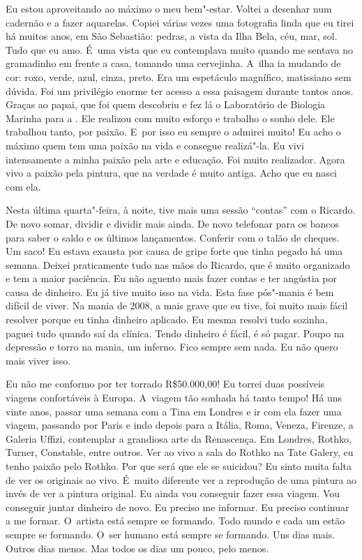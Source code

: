 Eu estou aproveitando ao máximo o meu bem"-estar. Voltei a desenhar num
cadernão e a fazer aquarelas. Copiei várias vezes uma fotografia linda
que eu tirei há muitos anos, em São Sebastião: pedras, a vista da Ilha
Bela, céu, mar, sol. Tudo que eu amo. É~uma vista que eu contemplava
muito quando me sentava no gramadinho em frente a casa, tomando uma
cervejinha. A~ilha ia mudando de cor: roxo, verde, azul, cinza, preto.
Era um espetáculo magnífico, matissiano sem dúvida. Foi um privilégio
enorme ter acesso a essa paisagem durante tantos anos. Graças ao papai,
que foi quem descobriu e fez lá o Laboratório de Biologia Marinha para a
. Ele realizou com muito esforço e trabalho o sonho dele. Ele
trabalhou tanto, por paixão. E~por isso eu sempre o admirei muito! Eu
acho o máximo quem tem uma paixão na vida e consegue realizá"-la. Eu vivi
intensamente a minha paixão pela arte e educação. Foi muito realizador.
Agora vivo a paixão pela pintura, que na verdade é muito antiga. Acho
que eu nasci com ela.

Nesta última quarta"-feira, à noite, tive mais uma sessão ``contas'' com
o Ricardo. De novo somar, dividir e dividir mais ainda. De novo
telefonar para os bancos para saber o saldo e os últimos lançamentos.
Conferir com o talão de cheques. Um saco! Eu estava exausta por causa de
gripe forte que tinha pegado há uma semana. Deixei praticamente tudo nas
mãos do Ricardo, que é muito organizado e tem a maior paciência. Eu não
aguento mais fazer contas e ter angústia por causa de dinheiro. Eu já
tive muito isso na vida. Esta fase pós"-mania é bem difícil de viver. Na
mania de 2008, a mais grave que eu tive, foi muito mais fácil resolver
porque eu tinha dinheiro aplicado. Eu mesma resolvi tudo sozinha, paguei
tudo quando saí da clínica. Tendo dinheiro é fácil, é só pagar. Poupo na
depressão e torro na mania, um inferno. Fico sempre sem nada. Eu não
quero mais viver isso.

Eu não me conformo por ter torrado R\$50.000,00! Eu torrei duas
possíveis viagens confortáveis à Europa. A~viagem tão sonhada há tanto
tempo! Há uns vinte anos, passar uma semana com a Tina em Londres e ir
com ela fazer uma viagem, passando por Paris e indo depois para a
Itália, Roma, Veneza, Firenze, a Galeria Uffizi, contemplar a grandiosa
arte da Renascença. Em Londres, Rothko, Turner, Constable, entre outros.
Ver ao vivo a sala do Rothko na Tate Galery, eu tenho paixão pelo
Rothko. Por que será que ele se suicidou? Eu sinto muita falta de ver os
originais ao vivo. É~muito diferente ver a reprodução de uma pintura ao
invés de ver a pintura original. Eu ainda vou conseguir fazer essa
viagem. Vou conseguir juntar dinheiro de novo. Eu preciso me informar.
Eu preciso continuar a me formar. O~artista está sempre se formando.
Todo mundo e cada um estão sempre se formando. O~ser humano está sempre
se formando. Uns dias mais. Outros dias menos. Mas todos os dias um
pouco, pelo menos.

